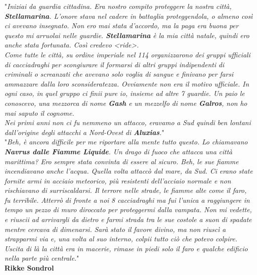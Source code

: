 \documentclass[10pt,twoside,onecolumn,openany]{book}
\begin{document}
\begin{quotebox}
	"\textit{Iniziai da guardia cittadina. Era nostro compito proteggere la nostra città, \textbf{Stellamarina}. L'onore stava nel cadere in battaglia proteggendola, o almeno così ci avevano insegnato. Non ero mai stata d'accordo, ma la paga era buona per questo mi arruolai nelle guardie. \textbf{Stellamarina} è la mia città natale, quindi ero anche stata fortunata. Così credevo <ride>.\\
	Come tutte le città, su ordine imperiale nel 114 organizzarono dei gruppi ufficiali di cacciadraghi per scongiurare il formarsi di altri gruppi indipendenti di criminali o screanzati che avevano solo voglia di sangue e finivano per farsi ammazzare dalla loro sconsideratezza. Ovviamente non era il motivo ufficiale. In ogni caso, in quel gruppo ci finii pure io, insieme ad altre 7 guardie. Un paio le conoscevo, una mezzorca di nome \textbf{Gash} e un mezzelfo di nome \textbf{Galros}, non ho mai saputo il cognome.\\
	Nei primi anni non ci fu nemmeno un attacco, eravamo a Sud quindi ben lontani dall'origine degli attacchi a Nord-Ovest di \textbf{Aluxias}.}"\\
	"\textit{Beh, è ancora difficile per me riportare alla mente tutto questo. Lo chiamavano \textbf{Navrus dalle Fiamme Liquide}. Un drago di fuoco che attacca una città marittima? Ero sempre stata convinta di essere al sicuro. Beh, le sue fiamme incendiavano anche l'acqua. Quella volta attaccò dal mare, da Sud. Ci erano state fornite armi in acciaio meteorico, più resistenti dell'acciaio normale e non rischiavano di surriscaldarsi. Il terrore nelle strade, le fiamme alte come il faro, fu terribile. Atterrò di fronte a noi 8 cacciadraghi ma fui l'unica a raggiungere in tempo un pezzo di muro diroccato per proteggermi dalla vampata. Non mi vedette, e riuscii ad arrivargli da dietro e farmi strada tra le sue costole a suon di spadate mentre cercava di dimenarsi. Sarà stato il favore divino, ma non riuscì a strapparmi via e, una volta al suo interno, colpii tutto ciò che potevo colpire. Uscita di là la città era in macerie, rimase in piedi solo il faro e qualche edificio nella parte più centrale.}"\\
	\textbf{Rikke Sondrol}
\end{quotebox}
\newpage
\end{document}

